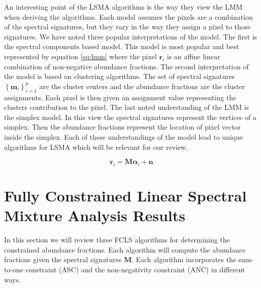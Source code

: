 \documentclass[journal]{IEEEtran}
\begin{document}
An interesting point of the LSMA algorithms is the way they view the LMM when deriving the algorithms. Each model assumes the pixels are a combination of the spectral signatures, but they vary in the way they assign a pixel to those signatures. We have noted three popular interpretations of the model. The first is the spectral components based model. This model is most popular and best represented by equation \ref{eq:lmm} where the pixel \(\mathbf{r}_i\) is an affine linear combination of non-negative abundance fractions. The second interpretation of the model is based on clustering algorithms. The set of spectral signatures \(\left\{\mathbf{m}_i\right\}_{i=1}^p\) are the cluster centers and the abundance fractions are the cluster assignments. Each pixel is then given an assignment value representing the clusters contribution to the pixel. The last noted understanding of the LMM is the simplex model. In this view the spectral signatures represent the vertices of a simplex. Then the abundance fractions represent the location of pixel vector inside the simplex. Each of these understandings of the model lead to unique algorithms for LSMA which will be relevant for our review.

\begin{equation}
\label{eq:lmm}
\mathbf{r}_i = \mathbf{M}\mathbf{\alpha}_i + \mathbf{n}
\end{equation}

\section{Fully Constrained Linear Spectral Mixture Analysis Results}
In this section we will review three FCLS algorithms for determining the constrained abundance fractions. Each algorithm will compute the abundance fractions given the spectral signatures \(\mathbf{M}\). Each algorithm incorporates the sum-to-one constraint (ASC) and the non-negativity constraint (ANC) in different ways.
\end{document}

